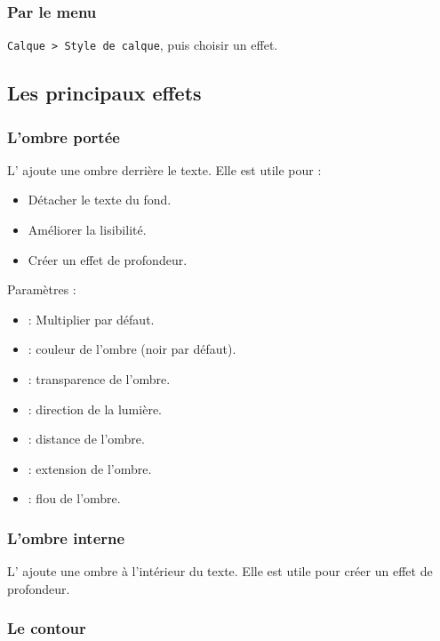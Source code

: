 \subsubsection{Par le menu}

\texttt{Calque > Style de calque}, puis choisir un effet.

\subsection{Les principaux effets}

\subsubsection{L'ombre portée}

L' ajoute une ombre derrière le texte. Elle est utile pour :

\begin{itemize}
    \item Détacher le texte du fond.
    \item Améliorer la lisibilité.
    \item Créer un effet de profondeur.
\end{itemize}

Paramètres :

\begin{itemize}
    \item {} : Multiplier par défaut.
    \item {} : couleur de l'ombre (noir par défaut).
    \item {} : transparence de l'ombre.
    \item {} : direction de la lumière.
    \item {} : distance de l'ombre.
    \item {} : extension de l'ombre.
    \item {} : flou de l'ombre.
\end{itemize}

\subsubsection{L'ombre interne}

L' ajoute une ombre à l'intérieur du texte. Elle est utile pour créer un effet de profondeur.

\subsubsection{Le contour}

